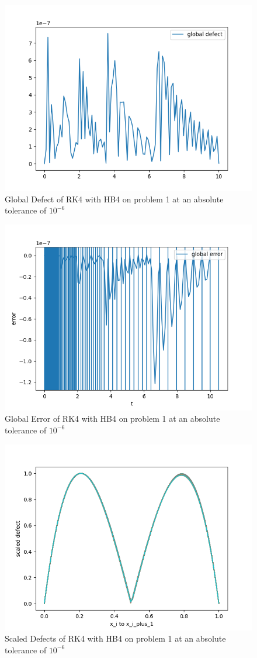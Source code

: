 \documentclass{article}
\begin{document}
\begin{figure}[H]
\centering
\includegraphics[width=0.7\linewidth]{./figures/rk4_with_hb4_p1_global_defect}
\caption{Global Defect of RK4 with HB4 on problem 1 at an absolute tolerance of $10^{-6}$}
\label{fig:rk4_with_hb4_p1_global_defect}
\end{figure}

\begin{figure}[H]
\centering
\includegraphics[width=0.7\linewidth]{./figures/rk4_with_hb4_p1_global_error}
\caption{Global Error of RK4 with HB4 on problem 1 at an absolute tolerance of $10^{-6}$}
\label{fig:rk4_with_hb4_p1_global_error}
\end{figure}

\begin{figure}[H]
\centering
\includegraphics[width=0.7\linewidth]{./figures/rk4_with_hb4_p1_scaled_defects}
\caption{Scaled Defects of RK4 with HB4 on problem 1 at an absolute tolerance of $10^{-6}$}
\label{fig:rk4_with_hb4_p1_scaled_defects}
\end{figure}
\end{document}
